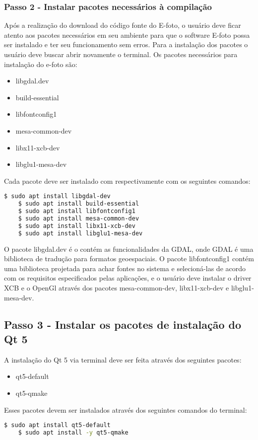 \subsubsection{Passo 2 - Instalar pacotes necessários à compilação}  
Após a realização do download do código fonte do E-foto, o usuário deve ficar atento aos pacotes necessários em seu ambiente para que o software E-foto possa ser instalado e ter seu funcionamento sem erros. Para a instalação dos pacotes o usuário deve buscar abrir novamente o terminal. Os pacotes necessários para instalação do e-foto são:
\begin{itemize}
   	\item libgdal.dev
   	\item build-essential
   	\item libfontconfig1
   	\item mesa-common-dev
   	\item libx11-xcb-dev
   	\item libglu1-mesa-dev
\end{itemize}
Cada pacote deve ser instalado com respectivamente com os seguintes comandos:	
\begin{lstlisting}[language=bash]
	$ sudo apt install libgdal-dev
	$ sudo apt install build-essential
	$ sudo apt install libfontconfig1
	$ sudo apt install mesa-common-dev
	$ sudo apt install libx11-xcb-dev 
	$ sudo apt install libglu1-mesa-dev
\end{lstlisting}				
	
O pacote libgdal.dev é o contém as funcionalidades da GDAL, onde GDAL é uma biblioteca de tradução para formatos geoespaciais. O pacote libfontconfig1 contém uma biblioteca projetada para achar fontes no sistema e selecioná-las de acordo com os requisitos especificados pelas aplicações, e o usuário deve instalar o driver XCB e o OpenGl através dos pacotes mesa-common-dev, libx11-xcb-dev e libglu1-mesa-dev. 
    
\subsection{Passo 3 - Instalar os pacotes de instalação do Qt 5}   
A instalação do Qt 5 via terminal deve ser feita através dos seguintes pacotes:
\begin{itemize}
	\item qt5-default
	\item qt5-qmake
\end{itemize}   
Esses pacotes devem ser instalados através dos seguintes comandos do terminal:
\begin{lstlisting}[language=bash]
	$ sudo apt install qt5-default
    $ sudo apt install -y qt5-qmake
\end{lstlisting}	
    
